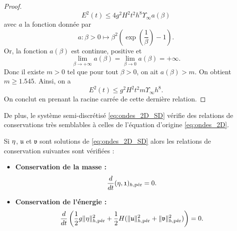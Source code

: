 \begin{proof}
\begin{equation}
E^2(t) \leq 4 g^2 H^2 t^2 h^8 \Upsilon_{\infty} a(\beta)
\end{equation}
avec $a$ la fonction donnée par
\begin{equation}
a : \beta > 0 \mapsto \beta^2 \left( \exp \left(\dfrac{1}{\beta} \right) -1 \right).
\end{equation}
Or, la fonction $a(\beta)$ est continue, positive et
\begin{equation}
\lim_{\beta \rightarrow + \infty} a(\beta) = \lim_{\beta \rightarrow 0} a(\beta) = + \infty.
\end{equation}
Donc il existe $m>0$ tel que pour tout $\beta>0$, on ait $a(\beta)>m$. On obtient $m \geq 1.545$. Ainsi, on a
\begin{equation}
E^2(t) \leq g^2 H^2 t^2 m \Upsilon_{\infty} h^8.
\end{equation}
On conclut en prenant la racine carrée de cette dernière relation.
\end{proof}

De plus, le système semi-discrétisé \eqref{eq:ondes_2D_SD} vérifie des relations de conservations très semblables à celles de l'équation d'origine \eqref{eq:ondes_2D}.

\begin{proposition}
Si $\etafrak$, $\mathfrak{u}$ et $\mathfrak{v}$ sont solutions de \eqref{eq:ondes_2D_SD} alors les relations de conservation suivantes sont vérifiées :
\begin{itemize}
\item \textbf{Conservation de la masse :}
\begin{equation}
\dfrac{d}{dt} (\etafrak, \mathfrak{1})_{h,\per} = 0.
\end{equation}
\item \textbf{Conservation de l'énergie :}
\begin{equation}
\dfrac{d}{dt} \left( \dfrac{1}{2} g \| \etafrak \|_{h,\per}^2 + \dfrac{1}{2} H ( \| \mathfrak{u} \|_{h,\per}^2 +  \| \mathfrak{v} \|_{h,\per}^2) \right) = 0.
\end{equation}
\end{itemize}
\end{proposition}

